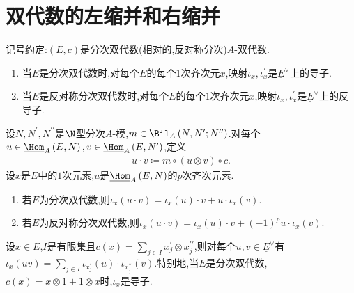 \section{双代数的左缩并和右缩并}

记号约定:$\left(E,c\right)$是分次双代数(相对的,反对称分次)$A$-双代数.

\begin{proposition}{}{}
	\begin{enumerate}
		\item 当$E$是分次双代数时,对每个$E$的每个$1$次齐次元$x$,映射$\iota_{x},\iota_{x}^{\prime}$是$\underline{E}^{\vee}$上的导子.
		\item 当$E$是反对称分次双代数时,对每个$E$的每个$1$次齐次元$x$,映射$\iota_{x},\iota_{x}^{\prime}$是$\underline{E}^{\vee}$上的反导子.
	\end{enumerate}
\end{proposition}

\begin{remark}{}{}
	设$N,N^{\prime},N^{\prime\prime}$是$\N$型分次$A$-模,$m\in\Bil_{A}\left(N,N^{\prime};N^{\prime\prime}\right)$.对每个$u\in\underline{\Hom}_{A}\left(E,N\right),v\in\underline{\Hom}_{A}\left(E,N^{\prime}\right)$,定义
	\begin{align*}
		u\cdot v\coloneq m\circ\left(u\otimes v\right)\circ c.
	\end{align*}
	设$x$是$E$中的$1$次元素,$u$是$\underline{\Hom}_{A}\left(E,N\right)$的$p$次齐次元素.
	\begin{enumerate}
		\item 若$E$为分次双代数,则$\iota_{x}\left(u\cdot v\right)=\iota_{x}\left(u\right)\cdot v+u\cdot\iota_{x}\left(v\right)$.
		\item 若$E$为反对称分次双代数,则$\iota_{x}\left(u\cdot v\right)=\iota_{x}\left(u\right)\cdot v+\left(-1\right)^{p}u\cdot\iota_{x}\left(v\right)$.
	\end{enumerate}
\end{remark}

\begin{remark}{}{}
	设$x\in E$,$I$是有限集且$c\left(x\right)=\sum\limits_{j\in I}x_{j}^{\prime}\otimes x_{j}^{\prime\prime}$,则对每个$u,v\in\underline{E}^{\vee}$有$\iota_{x}\left(uv\right)=\sum\limits_{j\in I}\iota_{x_{j}^{\prime}}\left(u\right)\cdot\iota_{x_{j}^{\prime\prime}}\left(v\right)$.特别地,当$E$是分次双代数,$c\left(x\right)=x\otimes 1+1\otimes x$时,$\iota_{x}$是导子.
\end{remark}






















